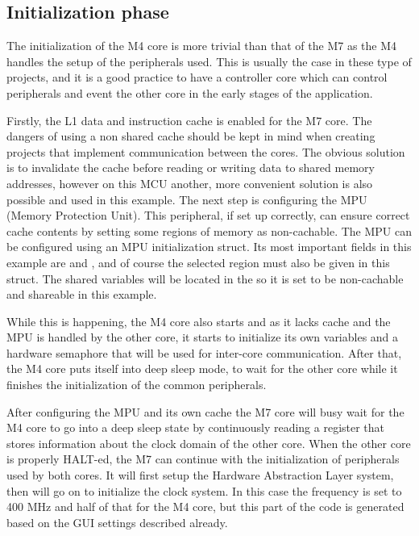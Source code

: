 \subsection{Initialization phase}

The initialization of the M4 core is more trivial than that of the M7 as the M4 handles the setup of the peripherals used. This is usually the case in these type of projects, and it is a good practice to have a controller core which can control peripherals and event the other core in the early stages of the application.

Firstly, the L1 data and instruction cache is enabled for the M7 core. The dangers of using a non shared cache should be kept in mind when creating projects that implement communication between the cores. The obvious solution is to invalidate the cache before reading or writing data to shared memory addresses, however on this MCU another, more convenient solution is also possible and used in this example. The next step is configuring the MPU (Memory Protection Unit). This peripheral, if set up correctly, can ensure correct cache contents by setting some regions of memory as non-cachable. The MPU can be configured using an MPU initialization struct. Its most important fields in this example are  and , and of course the selected region must also be given in this struct. The shared variables will be located in the  so it is set to be non-cachable and shareable in this example.

While this is happening, the M4 core also starts and as it lacks cache and the MPU is handled by the other core, it starts to initialize its own variables and a hardware semaphore that will be used for inter-core communication. After that, the M4 core puts itself into deep sleep mode, to wait for the other core while it finishes the initialization of the common peripherals.

After configuring the MPU and its own cache the M7 core will busy wait for the M4 core to go into a deep sleep state by continuously reading a register that stores information about the clock domain of the other core. When the other core is properly HALT-ed, the M7 can continue with the initialization of peripherals used by both cores. It will first setup the Hardware Abstraction Layer system, then will go on to initialize the clock system. In this case the frequency is set to 400 MHz and half of that for the M4 core, but this part of the code is generated based on the GUI settings described already.

